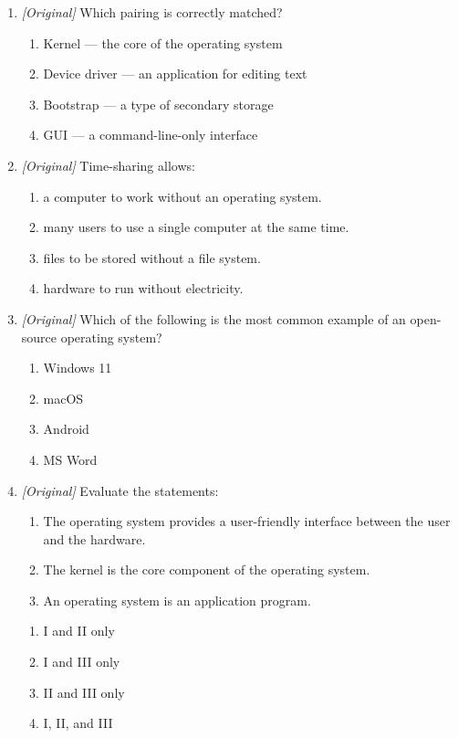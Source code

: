 \begin{enumerate}[label=\textbf{Q\arabic*.}, leftmargin=*]
\item \textit{[Original]} Which pairing is correctly matched?
  \begin{enumerate}[label=\Alph*.]
    \item Kernel --- the core of the operating system
    \item Device driver --- an application for editing text
    \item Bootstrap --- a type of secondary storage
    \item GUI --- a command-line-only interface
  \end{enumerate}
\item \textit{[Original]} Time-sharing allows:
  \begin{enumerate}[label=\Alph*.]
    \item a computer to work without an operating system.
    \item many users to use a single computer at the same time.
    \item files to be stored without a file system.
    \item hardware to run without electricity.
  \end{enumerate}
\item \textit{[Original]} Which of the following is the most common example of
  an open-source operating system?
  \begin{enumerate}[label=\Alph*.]
    \item Windows 11
    \item macOS
    \item Android
    \item MS Word
  \end{enumerate}
\item \textit{[Original]} Evaluate the statements:
  \begin{enumerate}[label=\Roman*.]
    \item The operating system provides a user-friendly interface between the
      user and the hardware.
    \item The kernel is the core component of the operating system.
    \item An operating system is an application program.
  \end{enumerate}
  \begin{enumerate}[label=\Alph*.]
    \item I and II only
    \item I and III only
    \item II and III only
    \item I, II, and III

\end{enumerate}
\end{enumerate}
